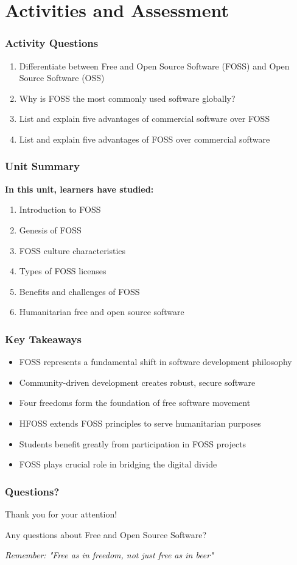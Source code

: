 \documentclass[aspectratio=169]{beamer}
\begin{document}
\section{Activities and Assessment}

\begin{frame}
\frametitle{Activity Questions}
\begin{enumerate}
\item Differentiate between Free and Open Source Software (FOSS) and Open Source Software (OSS)

\item Why is FOSS the most commonly used software globally?

\item List and explain five advantages of commercial software over FOSS

\item List and explain five advantages of FOSS over commercial software
\end{enumerate}
\end{frame}

\begin{frame}
\frametitle{Unit Summary}
\textbf{In this unit, learners have studied:}

\begin{enumerate}
\item Introduction to FOSS
\item Genesis of FOSS
\item FOSS culture characteristics
\item Types of FOSS licenses
\item Benefits and challenges of FOSS
\item Humanitarian free and open source software
\end{enumerate}
\end{frame}

\begin{frame}
\frametitle{Key Takeaways}
\begin{itemize}
\item FOSS represents a fundamental shift in software development philosophy
\item Community-driven development creates robust, secure software
\item Four freedoms form the foundation of free software movement
\item HFOSS extends FOSS principles to serve humanitarian purposes
\item Students benefit greatly from participation in FOSS projects
\item FOSS plays crucial role in bridging the digital divide
\end{itemize}
\end{frame}

\begin{frame}
\frametitle{Questions?}
\begin{center}
\Large Thank you for your attention!

\vspace{1cm}

Any questions about Free and Open Source Software?

\vspace{1cm}

\textit{Remember: "Free as in freedom, not just free as in beer"}
\end{center}
\end{frame}
\end{document}
